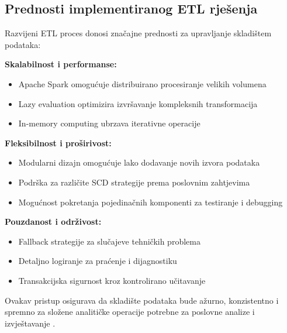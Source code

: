 \subsection{Prednosti implementiranog ETL rješenja}

Razvijeni ETL proces donosi značajne prednosti za upravljanje skladištem podataka:

\textbf{Skalabilnost i performanse:}
\begin{itemize}
    \item Apache Spark omogućuje distribuirano procesiranje velikih volumena
    \item Lazy evaluation optimizira izvršavanje kompleksnih transformacija
    \item In-memory computing ubrzava iterativne operacije
\end{itemize}

\textbf{Fleksibilnost i proširivost:}
\begin{itemize}
    \item Modularni dizajn omogućuje lako dodavanje novih izvora podataka
    \item Podrška za različite SCD strategije prema poslovnim zahtjevima
    \item Mogućnost pokretanja pojedinačnih komponenti za testiranje i debugging
\end{itemize}

\textbf{Pouzdanost i održivost:}
\begin{itemize}
    \item Fallback strategije za slučajeve tehničkih problema
    \item Detaljno logiranje za praćenje i dijagnostiku
    \item Transakcijska sigurnost kroz kontrolirano učitavanje
\end{itemize}

Ovakav pristup osigurava da skladište podataka bude ažurno, konzistentno i spremno za složene analitičke operacije potrebne za poslovne analize i izvještavanje \cite{Chaudhuri2011}.